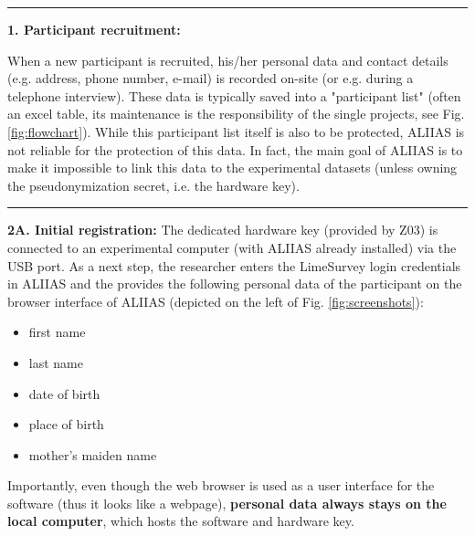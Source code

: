 \par\noindent\rule{\textwidth\color{pniblue}}{0.4pt}
\textbf{1. Participant recruitment:}
When a new participant is recruited, his/her personal data and contact details (e.g. address, phone number, e-mail) is recorded on-site (or e.g. during a telephone interview). These data is typically saved into a "participant list" (often an excel table, its maintenance is the responsibility of the single projects, see Fig. \ref{fig:flowchart}). While this participant list itself is also to be protected, ALIIAS is not reliable for the protection of this data. In fact, the main goal of ALIIAS is to make it impossible to link this data to the experimental datasets (unless owning the pseudonymization secret, i.e. the hardware key).


\par\noindent\rule{\textwidth\color{pniblue}}{0.4pt}
\textbf{2A. Initial registration:} The dedicated hardware key (provided by Z03) is connected to an experimental computer (with ALIIAS already installed) via the USB port. As a next step, the researcher enters the LimeSurvey login credentials in ALIIAS and the provides the following personal data of the participant on the browser interface of ALIIAS (depicted on the left of Fig. \ref{fig:screenshots}):
\begin{itemize}
    \item first name
    \item last name
    \item date of birth
    \item place of birth
    \item mother's maiden name
\end{itemize}

Importantly, even though the web browser is used as a user interface for the software (thus it looks like a webpage), \textbf{personal data always stays on the local computer}, which hosts the software and hardware key.


